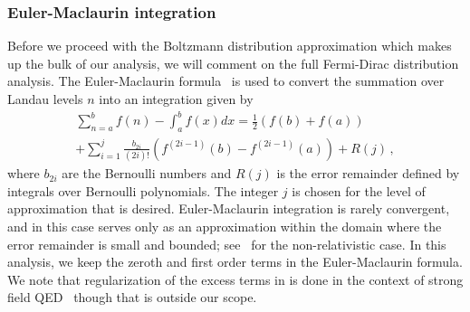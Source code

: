 \subsubsection{Euler-Maclaurin integration}
\label{sec:eulermac}
\noindent Before we proceed with the Boltzmann distribution approximation which makes up the bulk of our analysis, we will comment on the full Fermi-Dirac distribution analysis. The Euler-Maclaurin formula~\citep{abramowitz1988handbook} is used to convert the summation over Landau levels $n$ into an integration given by
\begin{multline}
    \label{eulermaclaurin}\sum^{b}_{n=a}f(n)-\int^{b}_{a}f(x)dx = \frac{1}{2}\left(f(b)+f(a)\right)\\
    +\sum_{i=1}^{j}\frac{b_{2i}}{(2i)!}\left(f^{(2i-1)}(b)-f^{(2i-1)}(a)\right)+R(j)\,,
\end{multline}
where $b_{2i}$ are the Bernoulli numbers and $R(j)$ is the error remainder defined by integrals over Bernoulli polynomials. The integer $j$ is chosen for the level of approximation that is desired. Euler-Maclaurin integration is rarely convergent, and in this case serves only as an approximation within the domain where the error remainder is small and bounded; see~\cite{greiner2012thermodynamics} for the non-relativistic case. In this analysis, we keep the zeroth and first order terms in the Euler-Maclaurin formula. We note that regularization of the excess terms in  is done in the context of strong field QED~\citep{greiner2008quantum} though that is outside our scope.

